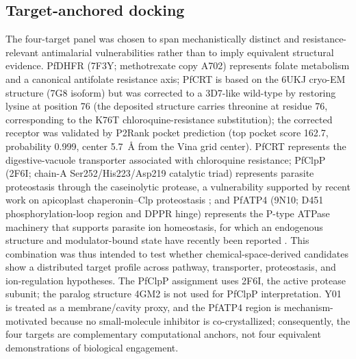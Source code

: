 \documentclass[11pt,a4paper]{article}
\begin{document}
	\subsection{Target-anchored docking}\label{sec:methods_docking}
	The four-target panel was chosen to span mechanistically distinct and resistance-relevant antimalarial vulnerabilities rather than to imply equivalent structural evidence. PfDHFR (7F3Y; methotrexate copy A702) represents folate metabolism and a canonical antifolate resistance axis; PfCRT is based on the 6UKJ cryo-EM structure (7G8 isoform) but was corrected to a 3D7-like wild-type by restoring lysine at position 76 (the deposited structure carries threonine at residue 76, corresponding to the K76T chloroquine-resistance substitution); the corrected receptor was validated by P2Rank pocket prediction (top pocket score 162.7, probability 0.999, center \qty{5.7}{\angstrom} from the Vina grid center). PfCRT represents the digestive-vacuole transporter associated with chloroquine resistance; PfClpP (2F6I; chain-A Ser252/His223/Asp219 catalytic triad) represents parasite proteostasis through the caseinolytic protease, a vulnerability supported by recent work on apicoplast chaperonin--Clp proteostasis \cite{Tissawak2025}; and PfATP4 (9N10; D451 phosphorylation-loop region and DPPR hinge) represents the P-type ATPase machinery that supports parasite ion homeostasis, for which an endogenous structure and modulator-bound state have recently been reported \cite{Haile2025}. This combination was thus intended to test whether chemical-space-derived candidates show a distributed target profile across pathway, transporter, proteostasis, and ion-regulation hypotheses. The PfClpP assignment uses 2F6I, the active protease subunit; the paralog structure 4GM2 is not used for PfClpP interpretation. Y01 is treated as a membrane/cavity proxy, and the PfATP4 region is mechanism-motivated because no small-molecule inhibitor is co-crystallized; consequently, the four targets are complementary computational anchors, not four equivalent demonstrations of biological engagement.
	
\end{document}
